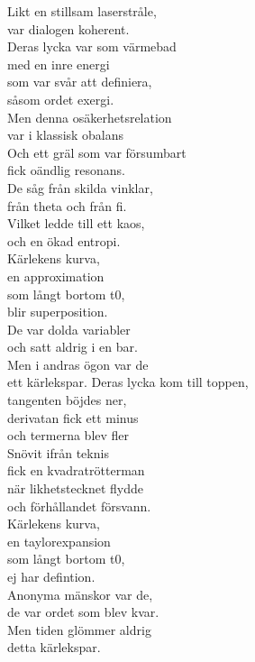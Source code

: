 \documentclass[a6paper, 10pt, twoside]{article}
\begin{document}
\begin{lyrics}
Likt en stillsam laserstråle, \\
var dialogen koherent. \\
Deras lycka var som värmebad \\
med en inre energi \\
som var svår att definiera, \\
såsom ordet exergi.
\vspace{5pt}\\
Men denna osäkerhetsrelation \\
var i klassisk obalans \\
Och ett gräl som var försumbart \\
fick oändlig resonans. \\
De såg från skilda vinklar, \\
från theta och från fi. \\
Vilket ledde till ett kaos, \\
och en ökad entropi.
\vspace{5pt}\\
Kärlekens kurva, \\
en approximation \\
som långt bortom t0, \\
blir superposition. \\
De var dolda variabler \\
och satt aldrig i en bar. \\
Men i andras ögon var de \\
ett kärlekspar. 
\newpage
\noindent
Deras lycka kom till toppen, \\
tangenten böjdes ner, \\
derivatan fick ett minus \\
och termerna blev fler \\
Snövit ifrån teknis \\
fick en kvadratrötterman \\
när likhetstecknet flydde \\
och förhållandet försvann.
\vspace{5pt}\\
Kärlekens kurva, \\
en taylorexpansion \\
som långt bortom t0, \\
ej har defintion. \\
Anonyma mänskor var de, \\
de var ordet som blev kvar. \\
Men tiden glömmer aldrig \\
detta kärlekspar.
\end{lyrics}
\end{document}
